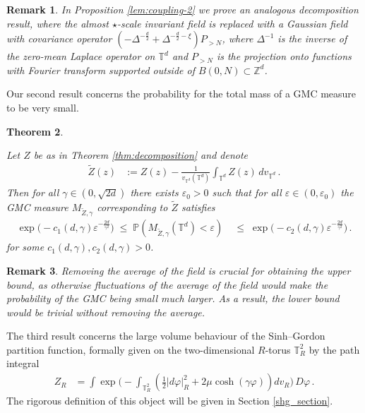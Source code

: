 \documentclass[11pt]{article}
\numberwithin{equation}{section}
\newtheorem{theorem}{Theorem}[section]
\newtheorem{remark}[theorem]{Remark}
\theoremstyle{definition}
\renewcommand{\tilde}{\widetilde}          %
\renewcommand{\leq}{\;\leqslant\;}                   %
\newcommand{\Z}{\mathbb{Z}}
\renewcommand{\P}{\mathbb{P}}
\def\eps{\varepsilon}
\def\T{\mathbb{T}}
\newcommand{\ab}{|}
\newcommand{\toR}{{\T_R^2}}
\newcommand{\PNN}{ {P_{>N}} }
\begin{document}
\begin{remark}
In Proposition \ref{lem:coupling-2} we prove an analogous decomposition result, where the almost $\star$-scale invariant field is replaced with a Gaussian field with covariance operator $(- \Delta^{- \frac{d}{2}} + \Delta^{- \frac{d}{2} - \xi}) \PNN$, where $\Delta^{-1}$ is the inverse of the zero-mean Laplace operator on $\T^d$ and $\PNN$ is the projection onto functions with Fourier transform supported outside of $B(0,N) \subset \Z^d$.
\end{remark}
\noindent
Our second result concerns the probability for the total mass of a GMC measure to be very small.

\begin{theorem}\label{sd_ub}

Let $Z$ be as in Theorem \ref{thm:decomposition} and denote
\begin{align*}
\tilde Z(z) &:= Z(z) - \frac{1}{v_{\T^d}(\T^d)} \int_{\T^d} Z(z) \, dv_{\T^d}\,.
\end{align*}
Then for all $\gamma \in (0, \sqrt{2d})$ there exists $\eps_0>0$ such that for all $\eps \in (0,\eps_0)$ the GMC measure $M_{\tilde Z,\gamma}$ corresponding to $\tilde Z$ satisfies
\begin{align*}
 \exp \big( - c_1(d,\gamma) \eps^{- \frac{2d}{\gamma^2}} \big) \leq  \P(M_{\tilde Z,\gamma}(\T^d) < \eps ) & \leq \exp \big( - c_2(d,\gamma) \eps^{- \frac{2d}{\gamma^2}} \big)\,.
\end{align*}
for some $c_1(d,\gamma), c_2(d,\gamma) > 0$.
\end{theorem}
\begin{remark}
Removing the average of the field is crucial for obtaining the upper bound, as otherwise fluctuations of the average of the field would make the probability of the GMC being small much larger. As a result, the lower bound would be trivial without removing the average.
\end{remark}
\noindent
The third result concerns the large volume behaviour of the Sinh--Gordon partition function, formally given on the two-dimensional $R$-torus $\toR$ by the path integral
\begin{align*}
Z_R &= \int \exp \big(- \int_{\toR} ( \tfrac 12 \ab d \varphi \ab_R^2  + 2 \mu \cosh(\gamma \varphi ) ) dv_{R} \big) \, D \varphi\,.
\end{align*}
The rigorous definition of this object will be given in Section \ref{shg_section}.
\end{document}
